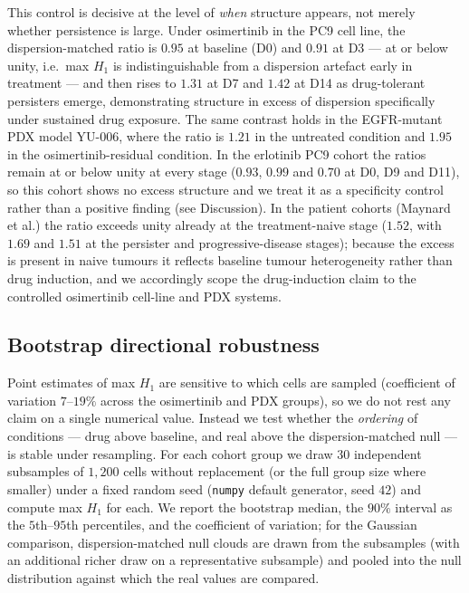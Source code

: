 This control is decisive at the level of \emph{when} structure
appears, not merely whether persistence is large. Under osimertinib in
the PC9 cell line, the dispersion-matched ratio is $0.95$ at baseline
(D0) and $0.91$ at D3 --- at or below unity, i.e.\ max $H_1$ is
indistinguishable from a dispersion artefact early in treatment ---
and then rises to $1.31$ at D7 and $1.42$ at D14 as drug-tolerant
persisters emerge, demonstrating structure in excess of dispersion
specifically under sustained drug exposure. The same contrast holds in
the EGFR-mutant PDX model YU-006, where the ratio is $1.21$ in the
untreated condition and $1.95$ in the osimertinib-residual condition.
In the erlotinib PC9 cohort the ratios remain at or below unity at
every stage ($0.93$, $0.99$ and $0.70$ at D0, D9 and D11), so this
cohort shows no excess structure and we treat it as a specificity
control rather than a positive finding (see Discussion). In the
patient cohorts (Maynard et al.) the ratio exceeds unity already at the
treatment-naive stage ($1.52$, with $1.69$ and $1.51$ at the
persister and progressive-disease stages); because the excess is
present in naive tumours it reflects baseline tumour heterogeneity
rather than drug induction, and we accordingly scope the
drug-induction claim to the controlled osimertinib cell-line and PDX
systems.

\subsection*{Bootstrap directional robustness}

Point estimates of max $H_1$ are sensitive to which cells are sampled
(coefficient of variation $7$--$19\%$ across the osimertinib and PDX
groups), so we do not rest any claim on a single numerical value.
Instead we test whether the \emph{ordering} of conditions --- drug
above baseline, and real above the dispersion-matched null --- is
stable under resampling. For each cohort group we draw $30$
independent subsamples of $1{,}200$ cells without replacement (or the
full group size where smaller) under a fixed random seed
(\texttt{numpy} default generator, seed $42$) and compute max $H_1$
for each. We report the bootstrap median, the $90\%$ interval as the
$5$th--$95$th percentiles, and the coefficient of variation; for the
Gaussian comparison, dispersion-matched null clouds are drawn from the
subsamples (with an additional richer draw on a representative
subsample) and pooled into the null distribution against which the
real values are compared.

